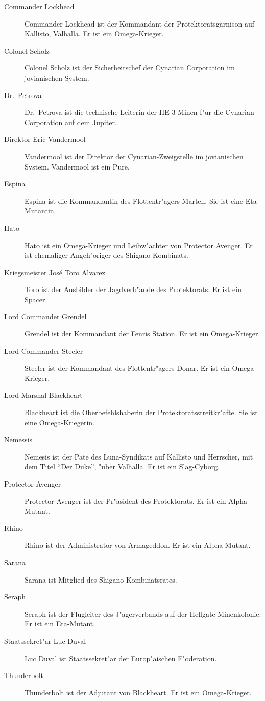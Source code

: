 
\begin{description}
\item [Commander Lockhead] Commander Lockhead ist der Kommandant der Protektoratsgarnison auf Kallisto, Valhalla. Er ist ein Omega-Krieger.
\item [Colonel Scholz] Colonel Scholz ist der Sicherheitschef der Cynarian Corporation im jovianischen System.
\item [Dr.~Petrova] Dr.~Petrova ist die technische Leiterin der HE-3-Minen f"ur die Cynarian Corporation auf dem Jupiter.
\item [Direktor Eric Vandermool]  Vandermool ist der Direktor der Cynarian-Zweigstelle im jovianischen System. Vandermool ist ein Pure.
\item [Espina] Espina ist die Kommandantin des Flottentr"agers Martell. Sie ist eine Eta-Mutantin.
\item [Hato] Hato ist ein Omega-Krieger und Leibw"achter von Protector Avenger. Er ist ehemaliger Angeh"origer des Shigano-Kombinats.
\item [Kriegsmeister Jos\'{e} \frqq{}Toro\flqq{} Alvarez] Toro ist der Ausbilder der Jagdverb"ande des Protektorats. Er ist ein Spacer.
\item [Lord Commander Grendel] Grendel ist der Kommandant der Fenris Station. Er ist ein Omega-Krieger.
\item [Lord Commander Steeler] Steeler ist der Kommandant des Flottentr"agers Donar. Er ist ein Omega-Krieger.
\item [Lord Marshal Blackheart] Blackheart ist die Oberbefehlshaberin der Protektoratsstreitkr"afte. Sie ist eine Omega-Kriegerin.
\item [Nemessis] Nemesis ist der Pate des Luna-Syndikats auf Kallisto und Herrscher, mit dem Titel ``Der Duke'', "uber Valhalla. Er ist ein 
      Slag-Cyborg. 
\item [Protector Avenger] Protector Avenger ist der Pr"asident des Protektorats. Er ist ein Alpha-Mutant.
\item [Rhino] Rhino ist der Administrator von Armageddon. Er ist ein Alpha-Mutant.
\item [Sarana] Sarana ist Mitglied des Shigano-Kombinatsrates.
\item [Seraph] Seraph ist der Flugleiter des J"agerverbands auf der Hellgate-Minenkolonie. Er ist ein Eta-Mutant.
\item [Staatssekret"ar Luc Duval] Luc Duval ist Staatssekret"ar der Europ"aischen F"oderation.
\item [Thunderbolt] Thunderbolt ist der Adjutant von Blackheart. Er ist ein Omega-Krieger. 
\end{description}
